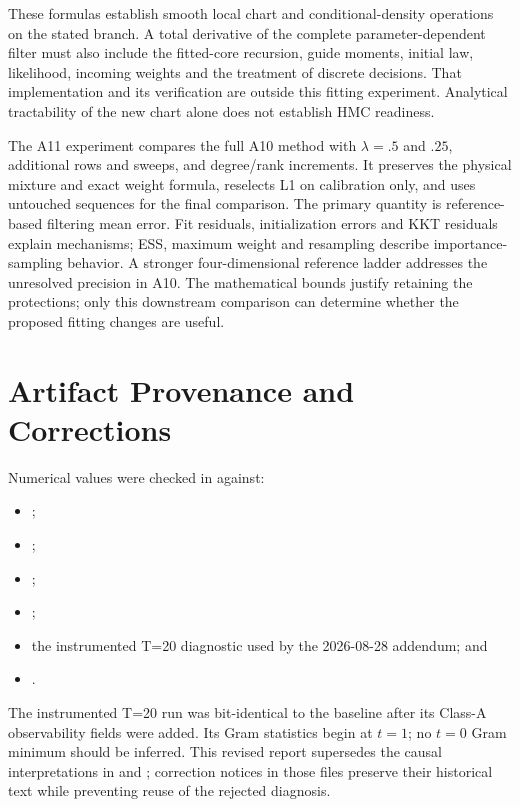 \documentclass[11pt]{article}
\begin{document}
These formulas establish smooth local chart and conditional-density
operations on the stated branch. A total derivative of the complete
parameter-dependent filter must also include the fitted-core recursion,
guide moments, initial law, likelihood, incoming weights and the treatment
of discrete decisions. That implementation and its verification are outside
this fitting experiment. Analytical tractability of the new chart alone
does not establish HMC readiness.

The A11 experiment compares the full A10 method with $\lambda=.5$ and
$.25$, additional rows and sweeps, and degree/rank increments. It preserves
the physical mixture and exact weight formula, reselects L1 on calibration
only, and uses untouched sequences for the final comparison. The primary
quantity is reference-based filtering mean error. Fit residuals,
initialization errors and KKT residuals explain mechanisms; ESS, maximum
weight and resampling describe importance-sampling behavior. A stronger
four-dimensional reference ladder addresses the unresolved precision in
A10. The mathematical bounds justify retaining the protections; only this
downstream comparison can determine whether the proposed fitting changes
are useful.

\appendix
\section{Artifact Provenance and Corrections}

Numerical values were checked in
 against:
\begin{itemize}
\item {};
\item {};
\item {};
\item {};
\item the instrumented T=20 diagnostic used by the 2026-08-28 addendum; and
\item {}.
\end{itemize}

The instrumented T=20 run was bit-identical to the baseline after its Class-A
observability fields were added. Its Gram statistics begin at $t=1$; no $t=0$
Gram minimum should be inferred. This revised report supersedes the causal
interpretations in  and
; correction notices in
those files preserve their historical text while preventing reuse of the
rejected diagnosis.
\end{document}
